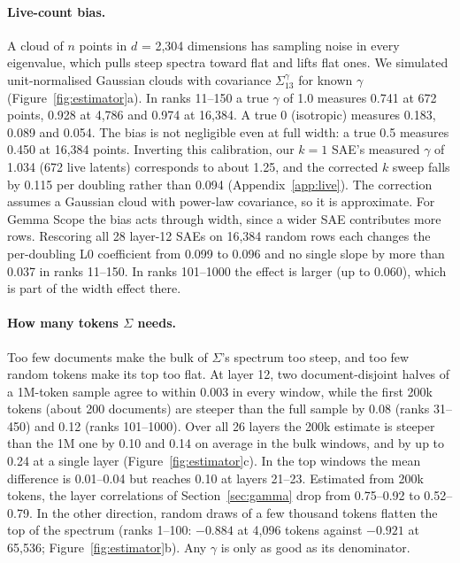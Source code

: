 \documentclass[10pt,twocolumn]{article}
\newcommand{\gam}{\gamma}
\begin{document}
\paragraph{Live-count bias.} A cloud of $n$ points in $d$ = 2,304 dimensions has sampling noise in every eigenvalue, which pulls steep spectra toward flat and lifts flat ones. We simulated unit-normalised Gaussian clouds with covariance $\Sigma_{13}^{\gam}$ for known $\gam$ (Figure~\ref{fig:estimator}a). In ranks 11--150 a true $\gam$ of 1.0 measures 0.741 at 672 points, 0.928 at 4,786 and 0.974 at 16,384. A true 0 (isotropic) measures 0.183, 0.089 and 0.054. The bias is not negligible even at full width: a true 0.5 measures 0.450 at 16,384 points. Inverting this calibration, our $k = 1$ SAE's measured $\gam$ of 1.034 (672 live latents) corresponds to about 1.25, and the corrected $k$ sweep falls by 0.115 per doubling rather than 0.094 (Appendix~\ref{app:live}). The correction assumes a Gaussian cloud with power-law covariance, so it is approximate. For Gemma Scope the bias acts through width, since a wider SAE contributes more rows. Rescoring all 28 layer-12 SAEs on 16,384 random rows each changes the per-doubling L0 coefficient from 0.099 to 0.096 and no single slope by more than 0.037 in ranks 11--150. In ranks 101--1000 the effect is larger (up to 0.060), which is part of the width effect there.

\paragraph{How many tokens $\Sigma$ needs.} Too few documents make the bulk of $\Sigma$'s spectrum too steep, and too few random tokens make its top too flat. At layer 12, two document-disjoint halves of a 1M-token sample agree to within 0.003 in every window, while the first 200k tokens (about 200 documents) are steeper than the full sample by 0.08 (ranks 31--450) and 0.12 (ranks 101--1000). Over all 26 layers the 200k estimate is steeper than the 1M one by 0.10 and 0.14 on average in the bulk windows, and by up to 0.24 at a single layer (Figure~\ref{fig:estimator}c). In the top windows the mean difference is 0.01--0.04 but reaches 0.10 at layers 21--23. Estimated from 200k tokens, the layer correlations of Section~\ref{sec:gamma} drop from 0.75--0.92 to 0.52--0.79. In the other direction, random draws of a few thousand tokens flatten the top of the spectrum (ranks 1--100: $-0.884$ at 4,096 tokens against $-0.921$ at 65,536; Figure~\ref{fig:estimator}b). Any $\gam$ is only as good as its denominator.
\end{document}
